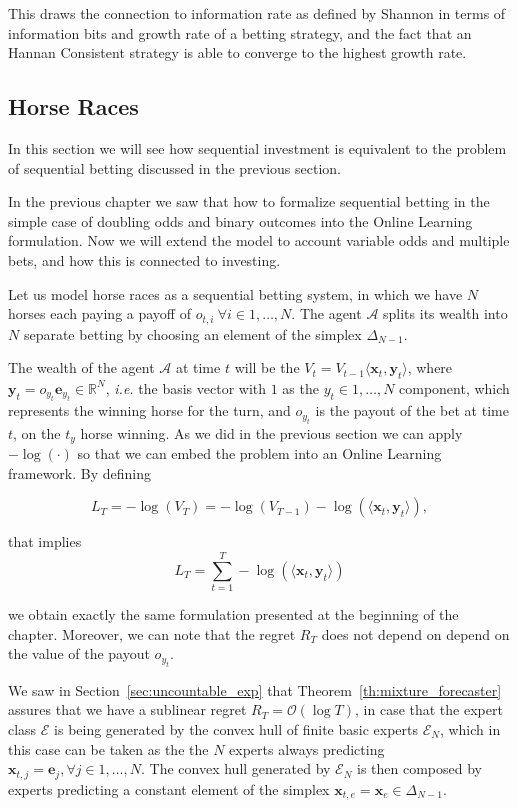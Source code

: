 This draws the connection to information rate as defined by Shannon in terms of information bits and growth rate of a betting strategy, and the fact that an Hannan Consistent strategy is able to converge to the highest growth rate. 

\subsection{Horse Races}

In this section we will see how sequential investment is equivalent to the problem of sequential betting discussed in the previous section.

In the previous chapter we saw that how to formalize sequential betting in the simple case of doubling odds and binary outcomes into the Online Learning formulation. Now we will extend the model to account variable odds and multiple bets, and how this is connected to investing.

Let us model horse races as a sequential betting system, in which we have $N$ horses each paying a payoff of $o_{t,i}\ \forall i\in 1,\ldots,N$. The agent $\mathcal A$ splits its wealth into $N$ separate betting by choosing an element of the simplex $\Delta_{N-1}$.

The wealth of the agent $\mathcal A$ at time $t$ will be the $V_t=V_{t-1}\langle \mathbf x_t, \mathbf y_t \rangle$, where $\mathbf y_t=o_{y_t}\mathbf e_{y_t}\in\mathbb R^N$, \emph{i.e.} the basis vector with $1$ as the $y_t\in1,\ldots,N$ component, which represents the winning horse for the turn, and $o_{y_t}$ is the payout of the bet at time $t$, on the $t_y$ horse winning. As we did in the previous section we can apply $-\log(\cdot)$ so that we can embed the problem into an Online Learning framework. By defining 

$$L_T=-\log(V_T)=-\log(V_{T-1})-\log(\langle \mathbf x_t,\mathbf y_t\rangle),$$

that implies 
\begin{equation}\label{eq:log_loss_hr}
L_T=\sum\limits_{t=1}^T-\log(\langle \mathbf x_t,\mathbf y_t\rangle)
\end{equation}

we obtain exactly the same formulation presented at the beginning of the chapter. Moreover, we can note that the regret $R_T$ does not depend on 
depend on the value of the payout $o_{y_t}$. 

We saw in Section~\ref{sec:uncountable_exp} that Theorem~\ref{th:mixture_forecaster} assures that we have a sublinear regret $R_T=\mathcal O(\log T)$, in case that the expert class $\mathcal E$ is being generated by the convex hull of finite basic experts $\mathcal E_N$, which in this case can be taken as the the $N$ experts always predicting $\mathbf x_{t,j}=\mathbf e_j, \forall j\in 1,\ldots,N$. The convex hull generated by $\mathcal E_N$ is then composed by experts predicting a constant element of the simplex $\mathbf x_{t,e}=\mathbf x_e\in \Delta_{N-1}$. 

